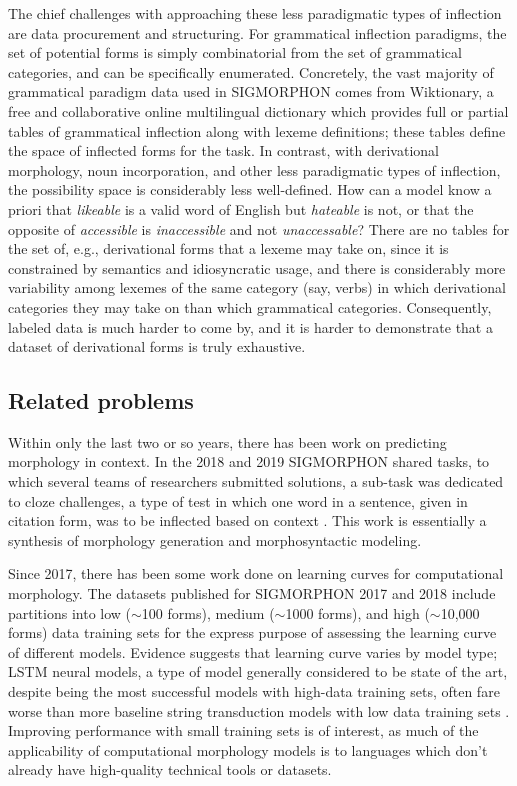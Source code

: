 The chief challenges with approaching these less paradigmatic types of inflection are data procurement and structuring. For grammatical inflection paradigms, the set of potential forms is simply combinatorial from the set of grammatical categories, and can be specifically enumerated. Concretely, the vast majority of grammatical paradigm data used in SIGMORPHON comes from Wiktionary, a free and collaborative online multilingual dictionary which provides full or partial tables of grammatical inflection along with lexeme definitions; these tables define the space of inflected forms for the task. In contrast, with derivational morphology, noun incorporation, and other less paradigmatic types of inflection, the possibility space is considerably less well-defined. How can a model know a priori that \textit{likeable} is a valid word of English but \textit{hateable} is not, or that the opposite of \textit{accessible} is \textit{inaccessible} and not \textit{unaccessable}? There are no tables for the set of, e.g., derivational forms that a lexeme may take on, since it is constrained by semantics and idiosyncratic usage, and there is considerably more variability among lexemes of the same category (say, verbs) in which derivational categories they may take on than which grammatical categories. Consequently, labeled data is much harder to come by, and it is harder to demonstrate that a dataset of derivational forms is truly exhaustive.

\subsection{Related problems}

Within only the last two or so years, there has been work on predicting morphology in context. In the 2018 and 2019 SIGMORPHON shared tasks, to which several teams of researchers submitted solutions, a sub-task was dedicated to cloze challenges, a type of test in which one word in a sentence, given in citation form, was to be inflected based on context \parencite{Cotterell2018b} \parencite{McCarthy2019}. This work is essentially a synthesis of morphology generation and morphosyntactic modeling.

Since 2017, there has been some work done on learning curves for computational morphology. The datasets published for SIGMORPHON 2017 and 2018 include partitions into low ($\sim$100 forms), medium ($\sim$1000 forms), and high ($\sim$10,000 forms) data training sets for the express purpose of assessing the learning curve of different models. Evidence suggests that learning curve varies by model type; LSTM neural models, a type of model generally considered to be state of the art, despite being the most successful models with high-data training sets, often fare worse than more baseline string transduction models with low data training sets \parencite{Cotterell2017} \parencite{Cotterell2018b}. Improving performance with small training sets is of interest, as much of the applicability of computational morphology models is to languages which don't already have high-quality technical tools or datasets. 

